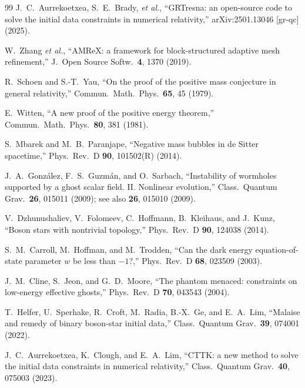 \documentclass[twocolumn,floatfix,aps,prd,nofootinbib]{revtex4-2}
\begin{document}
\begin{thebibliography}{99}
J.~C.~Aurrekoetxea, S.~E.~Brady, \emph{et al.},
\newblock ``GRTresna: an open-source code to solve the initial data constraints in numerical relativity,''
\newblock arXiv:2501.13046 [gr-qc] (2025).

W.~Zhang \emph{et al.},
\newblock ``AMReX: a framework for block-structured adaptive mesh refinement,''
\newblock J.\ Open Source Softw.\ \textbf{4}, 1370 (2019).

R.~Schoen and S.-T.~Yau,
\newblock ``On the proof of the positive mass conjecture in general relativity,''
\newblock Commun.\ Math.\ Phys.\ \textbf{65}, 45 (1979).

E.~Witten,
\newblock ``A new proof of the positive energy theorem,''
\newblock Commun.\ Math.\ Phys.\ \textbf{80}, 381 (1981).

S.~Mbarek and M.~B.~Paranjape,
\newblock ``Negative mass bubbles in de Sitter spacetime,''
\newblock Phys.\ Rev.\ D \textbf{90}, 101502(R) (2014).

J.~A.~Gonz\'alez, F.~S.~Guzm\'an, and O.~Sarbach,
\newblock ``Instability of wormholes supported by a ghost scalar field. II. Nonlinear evolution,''
\newblock Class.\ Quantum Grav.\ \textbf{26}, 015011 (2009); see also \textbf{26}, 015010 (2009).

V.~Dzhunushaliev, V.~Folomeev, C.~Hoffmann, B.~Kleihaus, and J.~Kunz,
\newblock ``Boson stars with nontrivial topology,''
\newblock Phys.\ Rev.\ D \textbf{90}, 124038 (2014).

S.~M.~Carroll, M.~Hoffman, and M.~Trodden,
\newblock ``Can the dark energy equation-of-state parameter $w$ be less than $-1$?,''
\newblock Phys.\ Rev.\ D \textbf{68}, 023509 (2003).

J.~M.~Cline, S.~Jeon, and G.~D.~Moore,
\newblock ``The phantom menaced: constraints on low-energy effective ghosts,''
\newblock Phys.\ Rev.\ D \textbf{70}, 043543 (2004).

T.~Helfer, U.~Sperhake, R.~Croft, M.~Radia, B.-X.~Ge, and E.~A.~Lim,
\newblock ``Malaise and remedy of binary boson-star initial data,''
\newblock Class.\ Quantum Grav.\ \textbf{39}, 074001 (2022).

J.~C.~Aurrekoetxea, K.~Clough, and E.~A.~Lim,
\newblock ``CTTK: a new method to solve the initial data constraints in numerical relativity,''
\newblock Class.\ Quantum Grav.\ \textbf{40}, 075003 (2023).


\end{thebibliography}
\end{document}
